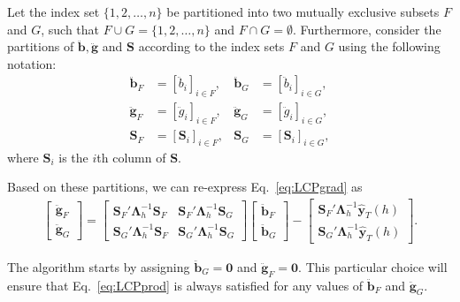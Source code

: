 \documentclass[11pt]{article}
\newcommand{\0}{\phantom{0}}
\begin{document}
Let the index set $\{1, 2, \dots, n\}$ be partitioned into two mutually exclusive subsets $F$ and $G$, such that $F \cup G = \{1, 2, \dots, n\}$ and $F \cap G = \emptyset$. Furthermore, consider the partitions of $\ddot{\bm{b}}, \ddot{\bm{g}}$ and $\bm{S}$ according to the index sets $F$ and $G$ using the following notation:
\begin{align*}
\ddot{\bm{b}}_{F} & = [\ddot{b}_{i}]_{i \in F}, & \ddot{\bm{b}}_{G} & = [\ddot{b}_{i}]_{i \in G},\\
\ddot{\bm{g}}_{F} & = [\ddot{g}_{i}]_{i \in F}, & \ddot{\bm{g}}_{G} & = [\ddot{g}_{i}]_{i \in G},\\
\bm{S}_{F} & = [\bm{S}_{i}]_{i \in F}, & \bm{S}_{G} & = [\bm{S}_{i}]_{i \in G},
\end{align*}
where $\bm{S}_{i}$ is the $i$th column of $\bm{S}$.

Based on these partitions, we can re-express Eq.~\eqref{eq:LCPgrad} as
\begin{align*}
\begin{bmatrix}
\ddot{\bm{g}}_{F}\\
\ddot{\bm{g}}_{G}
\end{bmatrix} =
\begin{bmatrix}
\bm{S}_{F}'\bm{\Lambda}_{h}^{-1}\bm{S}_{F} & \bm{S}_{F}'\bm{\Lambda}_{h}^{-1}\bm{S}_{G}\\
\bm{S}_{G}'\bm{\Lambda}_{h}^{-1}\bm{S}_{F} & \bm{S}_{G}'\bm{\Lambda}_{h}^{-1}\bm{S}_{G}
\end{bmatrix}
\begin{bmatrix}
\ddot{\bm{b}}_{F}\\
\ddot{\bm{b}}_{G}
\end{bmatrix} -
\begin{bmatrix}
\bm{S}_{F}'\bm{\Lambda}_{h}^{-1}\hat{\bm{y}}_{T}(h)\\
\bm{S}_{G}'\bm{\Lambda}_{h}^{-1}\hat{\bm{y}}_{T}(h)
\end{bmatrix}.
\end{align*}

The algorithm starts by assigning $\ddot{\bm{b}}_{G} = \bm{0}$ and $\ddot{\bm{g}}_{F} = \bm{0}$. This particular choice will ensure that Eq.~\eqref{eq:LCPprod} is always satisfied for any values of $\ddot{\bm{b}}_{F}$ and $\ddot{\bm{g}}_{G}$.
\end{document}
